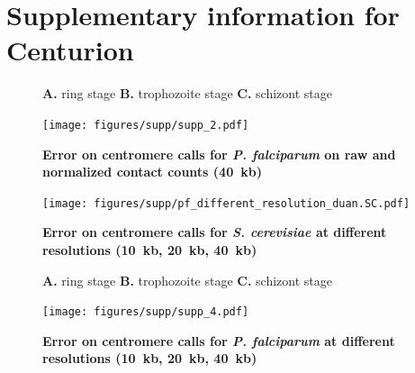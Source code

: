 \chapter{Supplementary information for Centurion}

\graphicspath{{9_centurion_supplementaries/}}


\begin{figure}[ht!]
\caption{\textbf{Error on centromere calls for \textit{P. falciparum} on raw
and normalized contact counts (40~kb)}}{
\textbf{A.} ring stage \textbf{B.}
trophozoite stage \textbf{C.} schizont stage}
\begin{center}
\texttt{[image: figures/supp/supp\_2.pdf]}
\end{center}
\label{suppfig:raw_vs_normed_pf}
\end{figure}

\clearpage

\begin{figure}[ht!]
\caption{\textbf{Error on centromere calls for \textit{S. cerevisiae}
at different resolutions (10~kb, 20~kb, 40~kb)}}
\begin{center}
\texttt{[image: figures/supp/pf\_different\_resolution\_duan.SC.pdf]}
\end{center}
\label{suppfig:error_diff_res_sc}
\end{figure}


\begin{figure}[ht!]
\caption{\textbf{Error on centromere calls for \textit{P. falciparum}
at different resolutions (10~kb, 20~kb, 40~kb)}}
{\textbf{A.} ring stage \textbf{B.} trophozoite stage \textbf{C.} schizont stage}
\begin{center}
\texttt{[image: figures/supp/supp\_4.pdf]}
\end{center}
\label{suppfig:error_diff_res_pf}
\end{figure}

\clearpage

